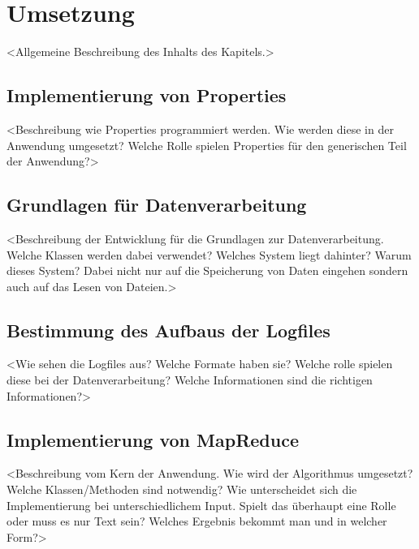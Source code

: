 
\chapter{Umsetzung}\label{cha:Umsetzung}
<Allgemeine Beschreibung des Inhalts des Kapitels.>

\section{Implementierung von Properties}
<Beschreibung wie Properties programmiert werden. Wie werden diese in der Anwendung umgesetzt? Welche Rolle spielen Properties für den generischen Teil der Anwendung?>

\section{Grundlagen für Datenverarbeitung}
<Beschreibung der Entwicklung für die Grundlagen zur Datenverarbeitung. Welche Klassen werden dabei verwendet? Welches System liegt dahinter? Warum dieses System? Dabei nicht nur auf die Speicherung von Daten eingehen sondern auch auf das Lesen von Dateien.>

\section{Bestimmung des Aufbaus der Logfiles}
<Wie sehen die Logfiles aus? Welche Formate haben sie? Welche rolle spielen diese bei der Datenverarbeitung? Welche Informationen sind die richtigen Informationen?>

\section{Implementierung von MapReduce}
<Beschreibung vom Kern der Anwendung. Wie wird der Algorithmus umgesetzt? Welche Klassen/Methoden sind notwendig? Wie unterscheidet sich die Implementierung bei unterschiedlichem Input. Spielt das überhaupt eine Rolle oder muss es nur Text sein? Welches Ergebnis bekommt man und in welcher Form?>